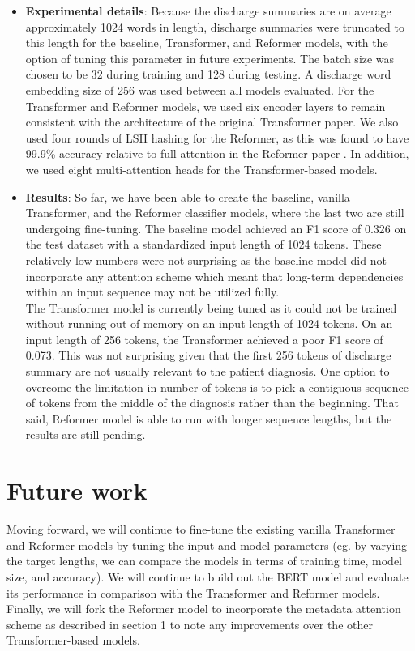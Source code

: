 \documentclass{article}
\begin{document}
\begin{itemize}
    \item \textbf{Experimental details}: Because the discharge summaries are on average approximately 1024 words in length, discharge summaries were truncated to this length for the baseline, Transformer, and Reformer models, with the option of tuning this parameter in future experiments. The batch size was chosen to be 32 during training and 128 during testing. A discharge word embedding size of 256 was used between all models evaluated. For the Transformer and Reformer models, we used six encoder layers to remain consistent with the architecture of the original Transformer paper. We also used four rounds of LSH hashing for the Reformer, as this was found to have 99.9\% accuracy relative to full attention in the Reformer paper \cite{kitaev2020reformer}. In addition, we used eight multi-attention heads for the Transformer-based models.  
    \item \textbf{Results}: So far, we have been able to create the baseline, vanilla Transformer, and the Reformer classifier models, where the last two are still undergoing fine-tuning. The baseline model achieved an F1 score of 0.326 on the test dataset with a standardized input length of 1024 tokens. These relatively low numbers were not surprising as the baseline model did not incorporate any attention scheme which meant that long-term dependencies within an input sequence may not be utilized fully. \\
    The Transformer model is currently being tuned as it could not be trained without running out of memory on an input length of 1024 tokens. On an input length of 256 tokens, the Transformer achieved a poor F1 score of 0.073. This was not surprising given that the first 256 tokens of discharge summary are not usually relevant to the patient diagnosis. One option to overcome the limitation in number of tokens is to pick a contiguous sequence of tokens from the middle of the diagnosis rather than the beginning. That said, Reformer model is able to run with longer sequence lengths, but the results are still pending. 
\end{itemize}

\section{Future work}
	Moving forward, we will continue to fine-tune the existing vanilla Transformer and Reformer models by tuning the input and model parameters (eg. by varying the target lengths, we can compare the models in terms of training time, model size, and accuracy). We will continue to build out the BERT model and evaluate its performance in comparison with the Transformer and Reformer models. Finally, we will fork the Reformer model to incorporate the metadata attention scheme as described in section 1 to note any improvements over the other Transformer-based models. 




\end{document}
